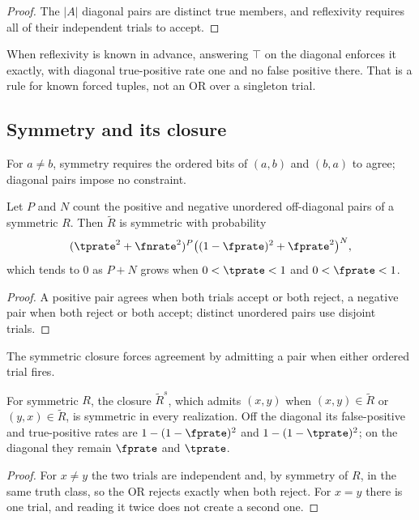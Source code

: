 \begin{proof}
The $|A|$ diagonal pairs are distinct true members, and reflexivity requires all
of their independent trials to accept.
\end{proof}

When reflexivity is known in advance, answering $\top$ on the diagonal enforces it
exactly, with diagonal true-positive rate one and no false positive there. That is
a rule for known forced tuples, not an OR over a singleton trial.

\subsection*{Symmetry and its closure}

For $a \ne b$, symmetry requires the ordered bits of $(a, b)$ and $(b, a)$ to
agree; diagonal pairs impose no constraint.

\begin{theorem}[Symmetry]
\label{thm:rel-symmetric}
Let $P$ and $N$ count the positive and negative unordered off-diagonal pairs of a
symmetric $R$. Then $\tilde R$ is symmetric with probability
\[
  (\tprate^2 + \fnrate^2)^P \bigl((1 - \fprate)^2 + \fprate^2\bigr)^N,
\]
which tends to $0$ as $P + N$ grows when $0 < \tprate < 1$ and $0 < \fprate < 1$.
\end{theorem}

\begin{proof}
A positive pair agrees when both trials accept or both reject, a negative pair
when both reject or both accept; distinct unordered pairs use disjoint trials.
\end{proof}

The symmetric closure forces agreement by admitting a pair when either ordered
trial fires.

\begin{theorem}
\label{thm:rel-symmetric-closure}
For symmetric $R$, the closure $\tilde R^{s}$, which admits $(x, y)$ when $(x, y)
\in \tilde R$ or $(y, x) \in \tilde R$, is symmetric in every realization. Off the
diagonal its false-positive and true-positive rates are $1 - (1 - \fprate)^2$ and
$1 - (1 - \tprate)^2$; on the diagonal they remain $\fprate$ and $\tprate$.
\end{theorem}

\begin{proof}
For $x \ne y$ the two trials are independent and, by symmetry of $R$, in the same
truth class, so the OR rejects exactly when both reject. For $x = y$ there is one
trial, and reading it twice does not create a second one.
\end{proof}

